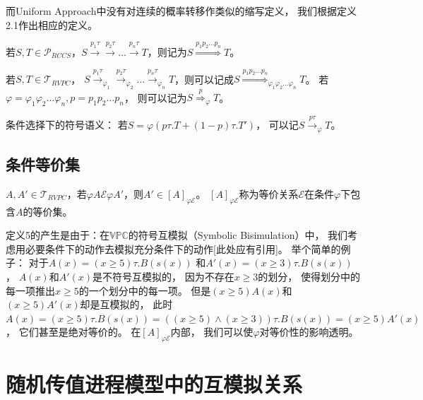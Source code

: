 而Uniform Approach中没有对连续的概率转移作类似的缩写定义，
我们根据定义2.1作出相应的定义。
\begin{definition}
   若$S,T\in \mathcal{P}_{RCCS}$，$S\stackrel{p_1\tau}{\rightarrow}\stackrel{p_2\tau}{\rightarrow}\dots\stackrel{p_n\tau}{\rightarrow}T$，则记为$S\stackrel{p_1p_2\dots p_n}{\Longrightarrow}T$。
\end{definition}

\begin{definition}
   若$S,T\in \mathcal{T}_{RVPC}$，
$S\stackrel{p_1\tau}{\rightarrow}_{\varphi_1}\stackrel{p_2\tau}{\rightarrow}_{\varphi_2}\dots \stackrel{p_n\tau}{\rightarrow}_{\varphi_n} T$，则可以记成$S\stackrel{p_1p_2\dots p_n}{\Longrightarrow}_{\varphi_1\varphi_2\dots\varphi_n} T$。
若$\varphi = \varphi_1\varphi_2\dots \varphi_n, p=p_1p_2\dots p_n$，
则可以记为$S\stackrel{p}{\Rightarrow}_{\varphi} T$。
\end{definition} 

\begin{definition}
   条件选择下的符号语义：
   若$S=\varphi (p\tau.T+(1-p)\tau.T')$，
   可以记$S\stackrel{p\tau}{\rightarrow}_{\varphi} T$。
\end{definition} 
\subsection{条件等价集}
 \begin{definition}
   $A,A'\in \mathcal{T}_{RVPC}$，若$\varphi A \mathcal{E} \varphi A'$，则$A'\in [A]_{\varphi \mathcal{E}}$。
   $[A]_{\varphi \mathcal{E}}$称为等价关系$\mathcal{E}$在条件$\varphi$下包含$A$的等价集。  
 \end{definition} 
 定义5的产生是由于：在$\mathbb{VPC}$的符号互模拟（Symbolic Bisimulation）中，
 我们考虑用必要条件下的动作去模拟充分条件下的动作[此处应有引用]。
 举个简单的例子：
 对于$A(x)=(x\geq 5)\tau.B(s(x))$
 和$A'(x)=(x\geq 3)\tau.B(s(x))$，
 $A(x)$和$A'(x)$是不符号互模拟的，
 因为不存在$x\geq 3$的划分，
 使得划分中的每一项推出$x\geq 5$的一个划分中的每一项。
 但是$(x\geq 5) A(x)$和$(x\geq 5) A'(x)$却是互模拟的，
 此时$A(x)=(x\geq 5)\tau.B(s(x)) = ((x\geq 5)\wedge (x\geq 3))\tau.B(s(x)) = (x\geq 5)A'(x)$，
 它们甚至是绝对等价的。
 在$[A]_{\varphi \mathcal{E}}$内部，
 我们可以使$\varphi$对等价性的影响透明。

\section{随机传值进程模型中的互模拟关系}

